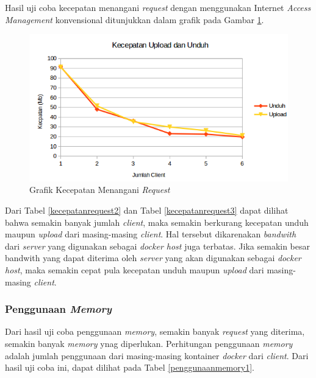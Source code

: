 Hasil uji coba kecepatan menangani \textit{request} dengan menggunakan Internet \textit{Access Management} konvensional ditunjukkan dalam grafik pada Gambar \ref{grafikkecepatan2}.

\begin{figure}[H]
	\centering
	\includegraphics[width=\linewidth]{images/bab5/kecepatan2}
	\caption{Grafik Kecepatan Menangani \textit{Request}}
	\label{grafikkecepatan2}
\end{figure}

Dari Tabel \ref{kecepatanrequest2} dan Tabel \ref{kecepatanrequest3} dapat dilihat bahwa semakin banyak jumlah \textit{client}, maka semakin berkurang kecepatan unduh maupun \textit{upload} dari masing-masing \textit{client}. Hal tersebut dikarenakan \textit{bandwith} dari \textit{server} yang digunakan sebagai \textit{docker host} juga terbatas. Jika semakin besar bandwith yang dapat diterima oleh \textit{server} yang akan digunakan sebagai \textit{docker host}, maka semakin cepat pula kecepatan unduh maupun \textit{upload} dari masing-masing \textit{client}. 

\subsubsection{Penggunaan \textit{Memory}}
Dari hasil uji coba penggunaan \textit{memory}, semakin banyak \textit{request} yang diterima, semakin banyak \textit{memory} ynag diperlukan. Perhitungan penggunaan \textit{memory} adalah jumlah penggunaan dari masing-masing kontainer \textit{docker} dari \textit{client}. Dari hasil uji coba ini, dapat dilihat pada Tabel \ref{penggunaanmemory1}.

